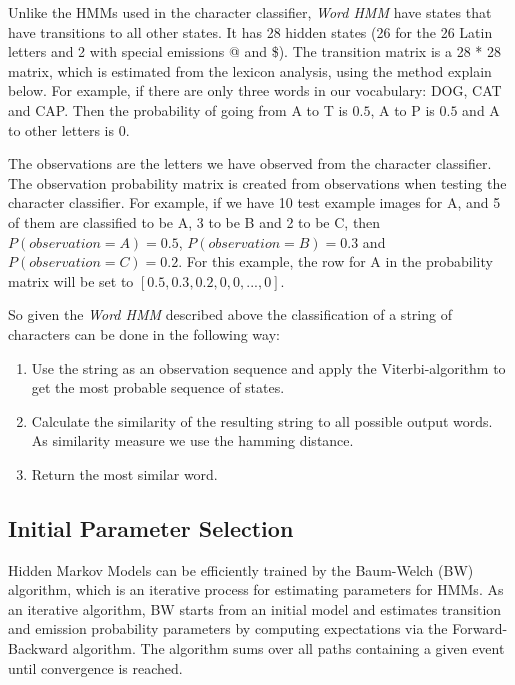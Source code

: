 Unlike the HMMs used in the character classifier, \textit{Word HMM} have states that have transitions to all other states.
It has 28 hidden states (26 for the 26 Latin letters and 2 with special emissions @ and \$). 
The transition matrix is a 28 * 28 matrix, which is estimated from the lexicon analysis, using the method explain below.
For example, if there are only three words in our vocabulary: DOG, CAT and CAP.
Then the probability of going from A to T is $0.5$, A to P is $0.5$ and A to other letters is $0$.

The observations are the letters we have observed from the character classifier.
The observation probability matrix is created from observations when testing the character classifier.
For example, if we have 10 test example images for A, and 5 of them are classified to be A, 3 to be B and 2 to be C, then $P(observation=A)=0.5$, $P(observation=B)=0.3$ and $P(observation=C)=0.2$.
For this example, the row for A in the probability matrix will be set to $[0.5, 0.3, 0.2, 0, 0,...,0]$.

So given the \textit{Word HMM} described above the classification of a string of characters can be done in the following way:

\begin{enumerate}
 \item Use the string as an observation sequence and apply the Viterbi-algorithm to get the most probable sequence of states.
 \item Calculate the similarity of the resulting string to all possible output words. As similarity measure we use the hamming distance. 
 \item Return the most similar word.
\end{enumerate}




\subsection{Initial Parameter Selection}

Hidden Markov Models can be efficiently trained by the Baum-Welch (BW) algorithm, which is an iterative process for estimating parameters for HMMs. 
As an iterative algorithm, BW starts from an initial model and estimates transition and emission probability parameters by computing expectations via the Forward-Backward algorithm.
The algorithm sums over all paths containing a given event until convergence is reached.

